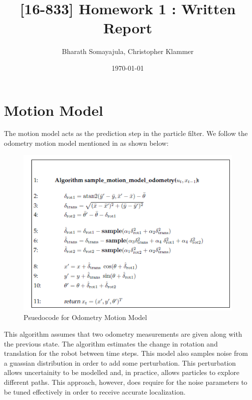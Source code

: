 \documentclass[12pt, a4paper]{article}
\title{[16-833] Homework 1 : Written Report}
\author{Bharath Somayajula, Christopher Klammer}
\date{\today}
\begin{document}
\maketitle

\tableofcontents

\clearpage
\section{Motion Model}
The motion model acts as the prediction step in the particle filter. We follow the odometry motion model mentioned in \cite{ProbRob} as shown below:


\begin{figure}[!htb]
  \center
  \includegraphics{OdometryMotionModel.png}
  \caption{Psuedocode for Odometry Motion Model \cite{ProbRob}}
\end{figure}

This algorithm assumes that two odometry measurements are given along with the previous state. The algorithm estimates the change in rotation and translation for the robot between time steps. This model also samples noise from a guassian distribution in order to add some perturbation. This perturbation allows uncertainity to be modelled and, in practice, allows particles to explore different paths. This approach, however, does require for the noise parameters to be tuned effectively in order to receive accurate localization.
\end{document}
